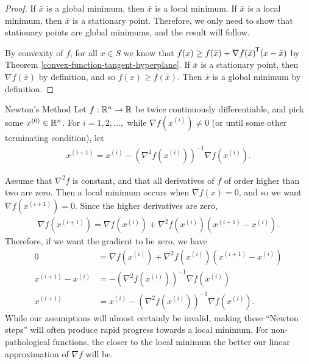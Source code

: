 \begin{proof}
    If $\bar{x}$ is a global minimum, then $\bar{x}$ is a local minimum. If $\bar{x}$ is a local minimum, then $\bar{x}$ is a stationary point. Therefore, we only need to show that stationary points are global minimums, and the result will follow.

    By convexity of $f$, for all $x \in S$ we know that $f(x) \geq f(\bar{x}) + {\nabla f(\bar{x})}^{\mkern-1.5mu\mathsf{T}}(x - \bar{x})$ by Theorem \ref{convex-function-tangent-hyperplane}. If $\bar{x}$ is a stationary point, then $\nabla f(\bar{x})$ by definition, and so $f(x) \geq f(\bar{x})$. Then $\bar{x}$ is a global minimum by definition.
\end{proof}

\begin{defn}{Newton's Method}\label{newtons-method}\proofbreak
    Let $f: \mathbb{R}^n \to \mathbb{R}$ be twice continuously differentiable, and pick some $x^{(0)} \in \mathbb{R}^n$. For $i = 1, 2, \ldots, $ while $\nabla f(x^{(i)}) \neq 0$ (or until some other terminating condition), let
    \begin{align*}
        x^{(i+1)} = x^{(i)} - \left(\nabla^2f(x^{(i)})\right)^{-1}\nabla f(x^{(i)}).
    \end{align*}
\end{defn}

\begin{rmk}
    Assume that $\nabla^2f$ is constant, and that all derivatives of $f$ of order higher than two are zero. Then a local minimum occurs when $\nabla f(x) = 0$, and so we want $\nabla f(x^{(i+1)}) = 0$. Since the higher derivatives are zero,
    \begin{align*}
        \nabla f(x^{(i+1)}) = \nabla f(x^{(i)}) + \nabla^2f(x^{(i)})(x^{(i+1)} - x^{(i)}).
    \end{align*}
    Therefore, if we want the gradient to be zero, we have
    \begin{align*}
        0 &= \nabla f(x^{(i)}) + \nabla^2f(x^{(i)})(x^{(i+1)} - x^{(i)}) \\
        x^{(i+1)} - x^{(i)} &= -\left(\nabla^2f(x^{(i)})\right)^{-1}\nabla f(x^{(i)}) \\
        x^{(i+1)} &= x^{(i)} - \left(\nabla^2f(x^{(i)})\right)^{-1}\nabla f(x^{(i)}).
    \end{align*}
    While our assumptions will almost certainly be invalid, making these ``Newton steps'' will often produce rapid progress towards a local minimum. For non-pathological functions, the closer to the local minimum the better our linear approximation of $\nabla f$ will be.
\end{rmk}

